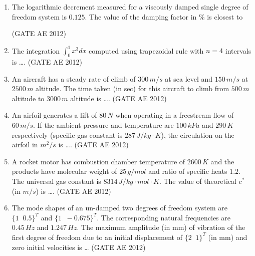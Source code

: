 \documentclass[journal,12pt,onecolumn]{IEEEtran}
\theoremstyle{remark}
\begin{document}
\begin{enumerate}
\item The logarithmic decrement measured for a viscously damped single degree of freedom system is $0.125$. The value of the damping factor in \% is closest to
\begin{enumerate}
\end{enumerate}
\hfill(GATE AE 2012)



\item The integration $\int_{0}^{1} x^3 dx$ computed using trapezoidal rule with $n = 4$ intervals is \dots.
\hfill(GATE AE 2012)



\item An aircraft has a steady rate of climb of $300 \, m/s$ at sea level and $150 \, m/s$ at $2500 \, m$ altitude. The time taken (in sec) for this aircraft to climb from $500 \, m$ altitude to $3000 \, m$ altitude is \dots.
\hfill(GATE AE 2012)



\item An airfoil generates a lift of $80 \, N$ when operating in a freestream flow of $60 \, m/s$. If the ambient pressure and temperature are $100 \, kPa$ and $290 \, K$ respectively (specific gas constant is $287 \, J/kg \cdot K$), the circulation on the airfoil in $m^2/s$ is \dots.
\hfill(GATE AE 2012)



\item A rocket motor has combustion chamber temperature of $2600 \, K$ and the products have molecular weight of $25 \, g/mol$ and ratio of specific heats $1.2$. The universal gas constant is $8314 \, J/kg \cdot mol \cdot K$. The value of theoretical $c^*$ (in $m/s$) is \dots.
\hfill(GATE AE 2012)



\item The mode shapes of an un-damped two degrees of freedom system are 
$\{1 \;\; 0.5\}^T$ and $\{1 \;\; -0.675\}^T$. The corresponding natural frequencies are 
$0.45 \, Hz$ and $1.247 \, Hz$. The maximum amplitude (in mm) of vibration of the first 
degree of freedom due to an initial displacement of $\{2 \;\; 1\}^T$ (in mm) and zero 
initial velocities is \dots
\hfill(GATE AE 2012)




\end{enumerate}
\end{document}
